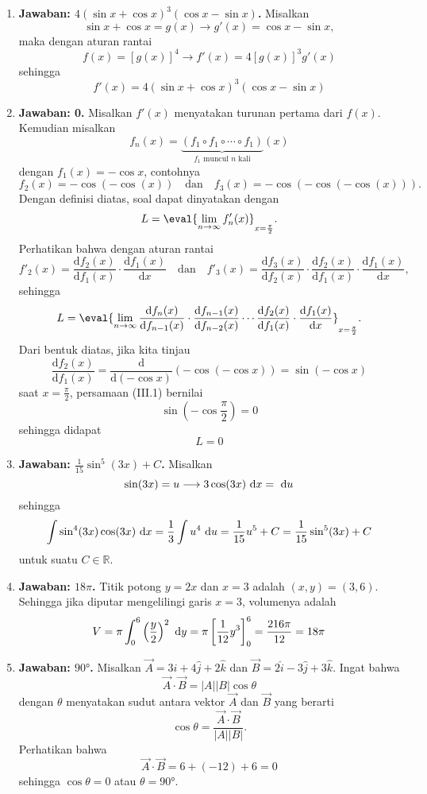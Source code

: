 \begin{enumerate}
\item \textbf{Jawaban: $4(\sin x+\cos x)^3(\cos x-\sin x)$.} Misalkan $$\sin x + \cos x = g(x)\longrightarrow g'(x) = \cos x - \sin x,$$maka dengan aturan rantai $$f(x) = [g(x)]^4 \longrightarrow f'(x) = 4[g(x)]^3g'(x)$$sehingga$$f'(x) = 4(\sin x +\cos x)^3(\cos x - \sin x)$$

\item \textbf{Jawaban: 0.} Misalkan $f'(x)$ menyatakan turunan pertama dari $f(x)$. Kemudian misalkan $$f_n(x) = \underbrace{(f_1\circ f_1\circ\cdots\circ f_1)}_{\text{$f_1$ muncul $n$ kali}}(x)$$dengan $f_1(x) = -\cos x$, contohnya $$f_2(x) = -\cos(-\cos(x))\quad\text{dan}\quad f_3(x) = -\cos(-\cos(-\cos(x))).$$ Dengan definisi diatas, soal dapat dinyatakan dengan $$L = \eval{\lim_{n\to\infty}f'_n(x)}_{x=\frac{\pi}{2}}.$$Perhatikan bahwa dengan aturan rantai $$f'_2(x) = \frac{\text{d}f_2(x)}{\text{d}f_1(x)}\cdot\frac{\text{d}f_1(x)}{\text{d}x}\quad\text{dan}\quad f'_3(x) = \frac{\text{d}f_3(x)}{\text{d}f_2(x)}\cdot\frac{\text{d}f_2(x)}{\text{d}f_1(x)}\cdot\frac{\text{d}f_1(x)}{\text{d}x},$$sehingga $$L = \eval{\lim_{n\to\infty}\frac{\text{d}f_n(x)}{\text{d}f_{n-1}(x)}\cdot\frac{\text{d}f_{n-1}(x)}{\text{d}f_{n-2}(x)}\cdots\frac{\text{d}f_2(x)}{\text{d}f_1(x)}\cdot\frac{\text{d}f_1(x)}{\text{d}x}}_{x=\frac{\pi}{2}}.$$Dari bentuk diatas, jika kita tinjau \setcounter{equation}{0}\begin{equation}\frac{\text{d}f_2(x)}{\text{d}f_1(x)} = \frac{\text{d}}{\text{d}(-\cos x)}(-\cos(-\cos x)) = \sin(-\cos x)\end{equation}saat $x=\frac{\pi}{2}$, persamaan (III.1) bernilai $$\sin\left(-\cos\frac{\pi}{2}\right) = 0$$sehingga didapat $$L = 0$$

\item \textbf{Jawaban: $\frac{1}{15}\sin^5(3x) + C$.} Misalkan $$\sin(3x) = u\longrightarrow 3\cos(3x)\text{ d}x = \text{ d}u$$sehingga$$\int \sin^4(3x)\cos(3x)\text{ d}x = \frac{1}{3}\int u^4\text{ d}u = \frac{1}{15}u^5 + C = \frac{1}{15}\sin^5(3x)+C$$untuk suatu $C\in\mathbb{R}$.

\item \textbf{Jawaban: $18\pi$.} Titik potong $y = 2x$ dan $x=3$ adalah $(x,y) = (3,6)$. Sehingga jika diputar mengelilingi garis $x=3$, volumenya adalah $$V = \pi\int_{0}^{6} \left(\frac{y}{2}\right)^2\text{ d}y = \pi\left[\frac{1}{12}y^3\right]_0^6 = \frac{216\pi}{12} =18\pi$$

\item \textbf{Jawaban: $\ang{90}$.} Misalkan $\vec{A} = 3\hat{i} + 4\hat{j} + 2\hat{k}$ dan $\vec{B} = 2\hat{i} - 3\hat{j} + 3\hat{k}$. Ingat bahwa $$\vec{A}\cdot\vec{B} = |A||B|\cos{\theta}$$dengan $\theta$ menyatakan sudut antara vektor $\vec{A}$ dan $\vec{B}$ yang berarti $$\cos\theta = \frac{\vec{A}\cdot\vec{B}}{|A||B|}.$$Perhatikan bahwa $$\vec{A} \cdot \vec{B} = 6 + (-12) + 6 = 0$$sehingga $\cos\theta = 0$ atau $\theta = \ang{90}$.


\end{enumerate}
